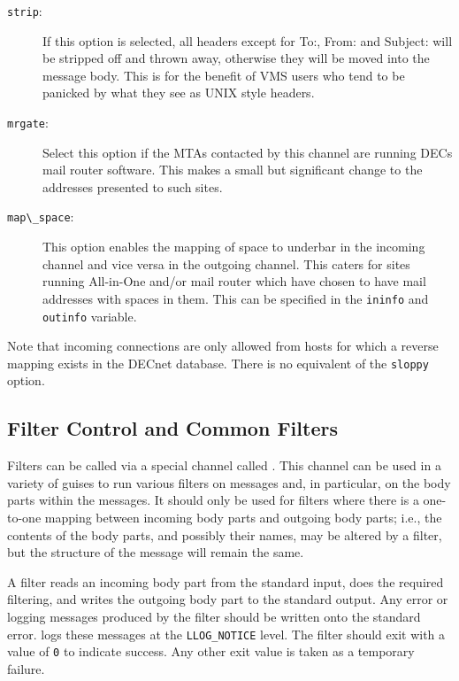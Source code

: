 \begin{description}
\item[\verb|strip|:] If this option is selected, all headers except
for To:, From: and Subject: will be stripped off and thrown away,
otherwise they will be moved into the message body. This is for the
benefit of VMS users who tend to be panicked by what they see as UNIX
style headers.

\item[\verb|mrgate|:]
Select this option if the MTAs contacted by this channel are running
DECs mail router software. This makes a small but significant change
to the addresses presented to such sites.

\item[\verb|map\_space|:]
This option enables the mapping of space to underbar in the incoming
channel and vice versa in the outgoing channel. This caters for sites
running All-in-One and/or mail router which have chosen to have mail
addresses with spaces in them. This can be specified in the
\verb|ininfo| and \verb|outinfo| variable.
\end{description}

Note that incoming connections are only allowed from hosts for which a
reverse mapping exists in the DECnet database. There is no equivalent
of the  \verb|sloppy| option.

\subsection	{Filter Control and Common Filters} 

Filters can be called via a special channel called .
This channel can be used in a variety of guises to run various filters
on messages and, in particular, on the body parts within the messages.
It should only be used for filters where there is a one-to-one mapping
between incoming body parts and outgoing body parts; i.e., the contents
of the body parts, and possibly their names, may be altered by a
filter, but the structure of the message will remain the same.

A filter reads an incoming body part from the standard input, does the
required filtering, and writes the outgoing body part to the standard
output.  Any error or logging messages produced by the filter should
be written onto the standard error.  logs these messages
at the \verb+LLOG_NOTICE+ level. The filter should exit with a value
of \verb|0| to indicate success. Any other exit value is taken as
a temporary failure.

